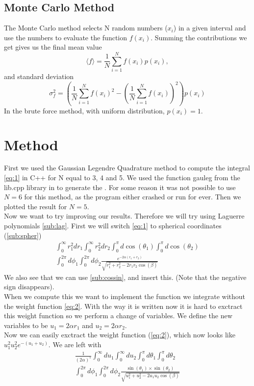 \documentclass{emulateapj}
\begin{document}
	\subsection{Monte Carlo Method}
	The Monte Carlo method selects N random numbers ($x_i$) in a given interval and use the numbers to evaluate the function $f(x_i)$. Summing the contributions we get gives us the final mean value 
	\begin{equation}
	\langle f \rangle = \frac{1}{N}\sum_{i=1}^N f(x_i) p(x_i),
	\end{equation}{}
	and standard deviation
	\begin{equation} \label{eq:undis}
	\sigma^2_f = \left( \frac{1}{N}\sum_{i=1}^{N} f(x_i)^2 - \left( \frac{1}{N}\sum_{i=1}^N f(x_i)\right)^2 \right) p(x_i)
	\end{equation}{}
	In the brute force method, with uniform distribution, $p(x_i)=1$.
	\section{Method}
	\label{sec:method}
	First we used the Gaussian Legendre Quadrature method to compute the integral \ref{eq:1} in C++ for N equal to 3, 4 and 5. We used the function gauleg from the lib.cpp library in \cite{1} to generate the . For some reason it was not possible to use $N = 6$ for this method, as the program either crashed or run for ever. Then we plotted the result for $N = 5$. \\
	
	Now we want to try improving our results. Therefore we will try using Laguerre polynomials \ref{sub:lag}.
	First we will switch \ref{eq:1} to spherical coordinates (\ref{sub:spher})
	\begin{align*}
	\int_0^{\infty} r_1^2dr_1 \int_0^{\infty}r_2^2dr_2 \int_0^{\pi}d\cos(\theta_1) \int_0^{\pi}d\cos(\theta_2) \\ \int_0^{2\pi}d\phi_1 \int_0^{2\pi}d\phi_2 \frac{e^{-2\alpha(r_1+r_2)}}{\sqrt{r_1^2+r_2^2-2r_1r_2\cos(\beta)}}
	\end{align*}
	We also see that we can use \ref{sub:cossin}, and insert this. (Note that the negative sign disappears). \\
	When we compute this we want to implement the function we integrate without the weight function \ref{eq:2}. With the way it is written now it is hard to exctract this weight function so we perform a change of variables. We define the new variables to be $u_1 = 2\alpha r_1$ and $u_2 = 2\alpha r_2$. \\
	Now we can easily exctract the weight function (\ref{eq:2}), which now looks like $u_1^2u_2^2e^{-(u_1+u_2)}$. We are left with
	\begin{align*}
	\frac{1}{(2\alpha)^5}\int_0^{\infty} du_1 \int_0^{\infty}du_2 \int_0^{\pi}d\theta_1 \int_0^{\pi}d\theta_2 \\ \int_0^{2\pi}d\phi_1 \int_0^{2\pi}d\phi_2 \frac{\sin(\theta_1)\times \sin(\theta_2)}{\sqrt{u_1^2+u_2^2-2u_1u_2\cos(\beta)}}
	\end{align*} \\
	
\end{document}
